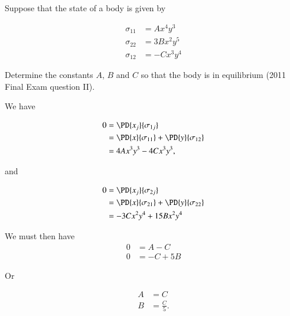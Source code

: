 \begin{Exercise}[title={Equilibrium.}, label={problem:elastic:displacements:exampractiseEquilibrium}]
Suppose that the state of a body is given by

\begin{equation}\label{eqn:continuumFluidsReviewXX:3130}
\begin{aligned}
\sigma_{11} &= A x^4 y^3 \\
\sigma_{22} &= 3 B x^2 y^5 \\
\sigma_{12} &= -C x^3 y^4
\end{aligned}
\end{equation}

Determine the constants $A$, $B$ and $C$ so that the body is in equilibrium (2011 Final Exam question II).
\end{Exercise}
\begin{Answer}[ref={problem:elastic:displacements:exampractiseEquilibrium}]
  We have

\begin{equation}\label{eqn:continuumFluidsReviewXX:3150}
\begin{aligned}
0 
&= \PD{x_j}{\sigma_{1j}} \\
&= 
\PD{x}{\sigma_{11}} + \PD{y}{\sigma_{12}} \\
&= 4 A x^3 y^3 - 4 C x^3 y^3,
\end{aligned}
\end{equation}

and

\begin{equation}\label{eqn:continuumFluidsReviewXX:3170}
\begin{aligned}
0 
&= \PD{x_j}{\sigma_{2j}} \\
&= 
\PD{x}{\sigma_{21}} + \PD{y}{\sigma_{22}} \\
&= -3 C x^2 y^4 + 15 B x^2 y^4
\end{aligned}
\end{equation}

We must then have
\begin{equation}\label{eqn:continuumFluidsReviewXX:3190}
\begin{aligned}
0 &= A - C \\
0 &= -C + 5 B
\end{aligned}
\end{equation} 

Or

\begin{equation}\label{eqn:continuumFluidsReviewXX:3210}
\begin{aligned}
A &= C \\
B &= \frac{C}{5}.
\end{aligned}
\end{equation}
\end{Answer}

